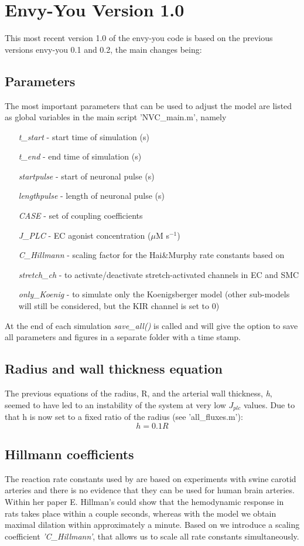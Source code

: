 \documentclass[12pt]{article}
\begin{document}
\section{Envy-You Version 1.0}
This most recent version 1.0 of the envy-you code is based on the previous versions envy-you 0.1 and 0.2, the main changes being:

\subsection{Parameters}
The most important parameters that can be used to adjust the model are listed as global variables in the main script 'NVC\_main.m', namely
\begin{itemize}
	\item [\textit{t\_start} -] start time of simulation (s)
	\item [\textit{t\_end} -]  end time of simulation (s)
	\item [\textit{startpulse} -]  start of neuronal pulse (s)
	\item [\textit{lengthpulse} -]  length of neuronal pulse (s)
	\item [\textit{CASE} -]  set of coupling coefficients 
	\item [\textit{J\_PLC} -]  EC agonist concentration ($\mu$M s$^{-1}$)
	\item [\textit{C\_Hillmann} -]  scaling factor for the Hai\&Murphy rate constants based on \citet{Hillman2011}
	\item [\textit{stretch\_ch} -] to activate/deactivate stretch-activated channels in EC and SMC
	\item [\textit{only\_Koenig} -]  to simulate only the Koenigsberger model (other sub-models will still be considered, but the KIR channel is set to 0)
\end{itemize}
At the end of each simulation \textit{save\_all()} is called and will give the option to save all parameters and figures in a separate folder with a time stamp. 

\subsection{Radius and wall thickness equation}
The previous equations of the radius, R, and the arterial wall thickness, \textit{h}, seemed to have led to an instability of the system at very low $J_{plc}$ values. Due to that h is now set to a fixed ratio of the radius (see 'all\_fluxes.m'):
\[h = 0.1R\]
\subsection{Hillmann coefficients}
The reaction rate constants used by \citep{Hai1988} are based on experiments with swine carotid arteries and there is no evidence that they can be used for human brain arteries. Within her paper \citep{Hillman2011} E. Hillman's  could show that the hemodynamic response in rats takes place within a couple seconds, whereas with the \citep{Hai1988} model we obtain maximal dilation within approximately a minute. Based on \citep{Hillman2011} we introduce a scaling coefficient \textit{'C\_Hillmann'}, that allows us to scale all rate constants simultaneously. 
\end{document}
